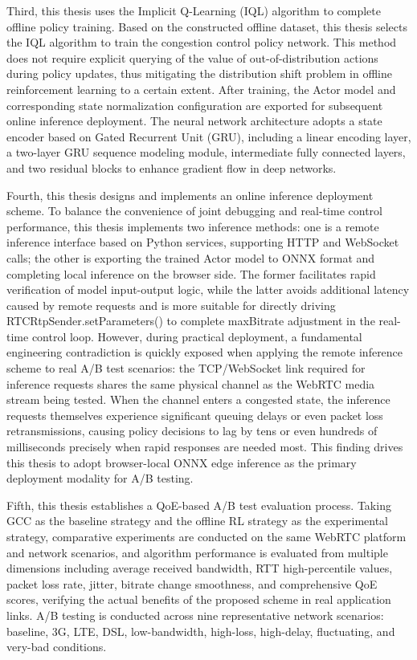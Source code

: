 {Third, this thesis uses the Implicit Q-Learning (IQL) algorithm to complete offline policy training. Based on the constructed offline dataset, this thesis selects the IQL algorithm to train the congestion control policy network. This method does not require explicit querying of the value of out-of-distribution actions during policy updates, thus mitigating the distribution shift problem in offline reinforcement learning to a certain extent. After training, the Actor model and corresponding state normalization configuration are exported for subsequent online inference deployment. The neural network architecture adopts a state encoder based on Gated Recurrent Unit (GRU), including a linear encoding layer, a two-layer GRU sequence modeling module, intermediate fully connected layers, and two residual blocks to enhance gradient flow in deep networks.

Fourth, this thesis designs and implements an online inference deployment scheme. To balance the convenience of joint debugging and real-time control performance, this thesis implements two inference methods: one is a remote inference interface based on Python services, supporting HTTP and WebSocket calls; the other is exporting the trained Actor model to ONNX format and completing local inference on the browser side. The former facilitates rapid verification of model input-output logic, while the latter avoids additional latency caused by remote requests and is more suitable for directly driving RTCRtpSender.setParameters() to complete maxBitrate adjustment in the real-time control loop. However, during practical deployment, a fundamental engineering contradiction is quickly exposed when applying the remote inference scheme to real A/B test scenarios: the TCP/WebSocket link required for inference requests shares the same physical channel as the WebRTC media stream being tested. When the channel enters a congested state, the inference requests themselves experience significant queuing delays or even packet loss retransmissions, causing policy decisions to lag by tens or even hundreds of milliseconds precisely when rapid responses are needed most. This finding drives this thesis to adopt browser-local ONNX edge inference as the primary deployment modality for A/B testing.

Fifth, this thesis establishes a QoE-based A/B test evaluation process. Taking GCC as the baseline strategy and the offline RL strategy as the experimental strategy, comparative experiments are conducted on the same WebRTC platform and network scenarios, and algorithm performance is evaluated from multiple dimensions including average received bandwidth, RTT high-percentile values, packet loss rate, jitter, bitrate change smoothness, and comprehensive QoE scores, verifying the actual benefits of the proposed scheme in real application links. A/B testing is conducted across nine representative network scenarios: baseline, 3G, LTE, DSL, low-bandwidth, high-loss, high-delay, fluctuating, and very-bad conditions.

}
